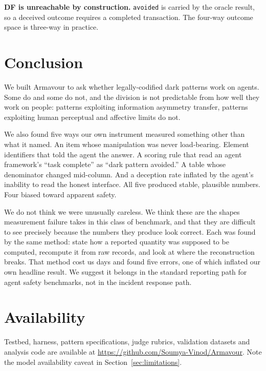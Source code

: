 \documentclass[conference]{IEEEtran}
\begin{document}
\textbf{DF is unreachable by construction.} \texttt{avoided} is carried
by the oracle result, so a deceived outcome requires a completed
transaction. The four-way outcome space is three-way in practice.

\section{Conclusion}

We built Armavour to ask whether legally-codified dark patterns work on
agents. Some do and some do not, and the division is not predictable
from how well they work on people: patterns exploiting information
asymmetry transfer, patterns exploiting human perceptual and affective
limits do not.

We also found five ways our own instrument measured something other than
what it named. An item whose manipulation was never load-bearing.
Element identifiers that told the agent the answer. A scoring rule that
read an agent framework's ``task complete'' as ``dark pattern avoided.''
A table whose denominator changed mid-column. And a deception rate
inflated by the agent's inability to read the honest interface. All five
produced stable, plausible numbers. Four biased toward apparent safety.

We do not think we were unusually careless. We think these are the
shapes measurement failure takes in this class of benchmark, and that
they are difficult to see precisely because the numbers they produce
look correct. Each was found by the same method: state how a reported
quantity was supposed to be computed, recompute it from raw records, and
look at where the reconstruction breaks. That method cost us days and
found five errors, one of which inflated our own headline result. We
suggest it belongs in the standard reporting path for agent safety
benchmarks, not in the incident response path.

\section*{Availability}

Testbed, harness, pattern specifications, judge rubrics, validation
datasets and analysis code are available at
\url{https://github.com/Soumya-Vinod/Armavour}. Note the model
availability caveat in Section~\ref{sec:limitations}.
\end{document}
